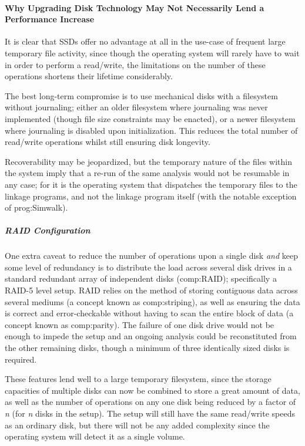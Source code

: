 \paragraph{Why Upgrading Disk Technology May Not Necessarily Lend a Performance Increase}

It is clear that SSDs offer no advantage at all in the use-case of frequent large temporary file activity, since though the operating system will rarely have to wait in order to perform a read/write, the limitations on the number of these operations shortens their lifetime considerably.

The best long-term compromise is to use mechanical disks with a filesystem without journaling; either an older filesystem where journaling was never implemented (though file size constraints may be enacted), or a newer filesystem where journaling is disabled upon initialization. This reduces the total number of read/write operations whilst still ensuring disk longevity.

Recoverability may be jeopardized, but the temporary nature of the files within the system imply that a re-run of the same analysis would not be resumable in any case; for it is the operating system that dispatches the temporary files to the linkage programs, and not the linkage program itself (with the  notable exception of \gls{prog:Simwalk}).


\subparagraph{RAID Configuration}

One extra caveat to reduce the number of operations upon a single disk \textit{and} keep some level of redundancy is to distribute the load across several disk drives in a standard redundant array of independent disks (\gls{comp:RAID}); specifically a RAID-5 level setup. RAID relies on the method of storing contiguous data across several mediums (a concept known as \gls{comp:striping}), as well as ensuring the data is correct and error-checkable without having to scan the entire block of data (a concept known as \gls{comp:parity}). The failure of one disk drive would not be enough to impede the setup and an ongoing analysis could be reconstituted from the other remaining disks, though a minimum of three identically sized disks is required.

These features lend well to a large temporary filesystem, since the storage capacities of multiple disks can now be combined to store a great amount of data, as well as the number of operations on any one disk being reduced by a factor of \textit{n} (for \textit{n} disks in the setup). The setup will still have the same read/write speeds as an ordinary disk, but there will not be any added complexity since the operating system will detect it as a single volume.


